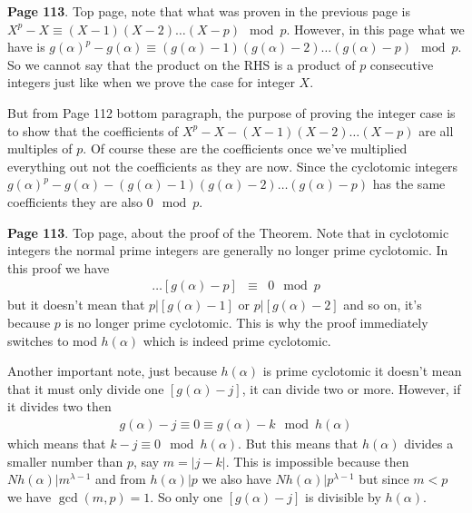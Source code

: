 \documentclass[aps,preprint,preprintnumbers,nofootinbib,showpacs,prd]{revtex4-1}
\newcommand{\nbea}{\begin{eqnarray*}}
\newcommand{\neea}{\end{eqnarray*}}
\begin{document}
{\bf Page 113}. Top page, note that what was proven in the previous page is $X^p - X \equiv (X - 1)(X - 2) \dots (X - p) \mod{p}$. However, in this page what we have is $g(\alpha)^p - g(\alpha) \equiv (g(\alpha) - 1)(g(\alpha) - 2)\dots (g(\alpha) - p) \mod{p}$. So we cannot say that the product on the RHS is a product of $p$ consecutive integers just like when we prove the case for integer $X$.

But from Page 112 bottom paragraph, the purpose of proving the integer case is to show that the coefficients of $X^p - X - (X - 1)(X - 2) \dots (X - p)$ are all multiples of $p$. Of course these are the coefficients once we've multiplied everything out not the coefficients as they are now. Since the cyclotomic integers $g(\alpha)^p - g(\alpha) - (g(\alpha) - 1)(g(\alpha) - 2)\dots (g(\alpha) - p)$ has the same coefficients they are also $0 \mod{p}$.

{\bf Page 113}. Top page, about the proof of the Theorem. Note that in cyclotomic integers the normal prime integers are generally no longer prime cyclotomic. In this proof we have
%
\nbea
[g(\alpha) - 1][g(\alpha) - 2] \dots [g(\alpha) - p] & \equiv & 0 \mod{p}
\neea
%
but it doesn't mean that $p|[g(\alpha) - 1]$ or $p|[g(\alpha) - 2]$ and so on, it's because $p$ is no longer prime cyclotomic. This is why the proof immediately switches to mod $h(\alpha)$ which is indeed prime cyclotomic.

Another important note, just because $h(\alpha)$ is prime cyclotomic it doesn't mean that it must only divide one $[g(\alpha) - j]$, it can divide two or more. However, if it divides two then
%
\nbea
g(\alpha) - j \equiv 0 \equiv g(\alpha) - k \mod{h(\alpha)}
\neea
%
which means that $k - j \equiv 0 \mod{h(\alpha)}$. But this means that $h(\alpha)$ divides a smaller number than $p$, say $m = |j - k|$. This is impossible because then $Nh(\alpha) | m^{\lambda - 1}$ and from $h(\alpha)|p$ we also have $Nh(\alpha) | p^{\lambda - 1}$ but since $m < p$ we have $\gcd(m,p) = 1$. So only one $[g(\alpha) - j]$ is divisible by $h(\alpha)$.
\end{document}
